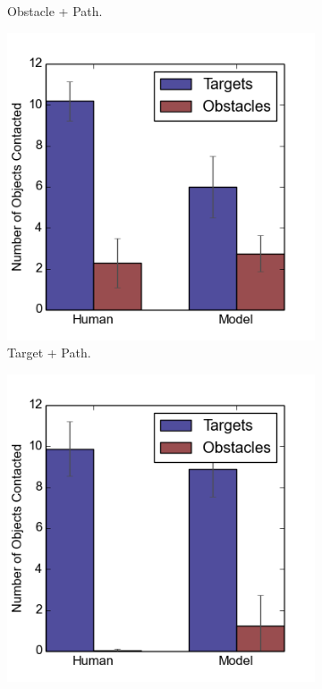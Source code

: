 \begin{figure}[h]
\begin{subfigure}[b]{0.24\textwidth}
\caption{Obstacle + Path. }
\end{subfigure}
\begin{subfigure}[b]{0.24\textwidth}
\includegraphics[width=\textwidth]{contact3.png}
\caption{Target + Path. }
\end{subfigure}
\begin{subfigure}[b]{0.24\textwidth}
\includegraphics[width=\textwidth]{contact4.png}

\end{subfigure}
\end{figure}
